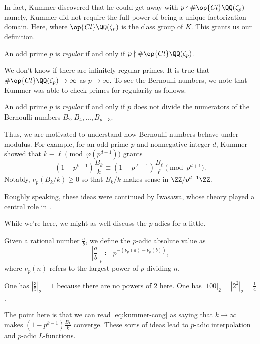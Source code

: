 \documentclass{article}
\begin{document}
In fact, Kummer discovered that he could get away with $p\nmid\#\op{Cl}\QQ(\zeta_p)$---namely, Kummer did not require the full power of being a unique factorization domain. Here, where $\op{Cl}\QQ(\zeta_p)$ is the class group of $K$. This grants us our definition.
\begin{definition}[regular]
	An odd prime $p$ is \textit{regular} if and only if $p\nmid\#\op{Cl}\QQ(\zeta_p)$.
\end{definition}
We don't know if there are infinitely regular primes. It is true that $\#\op{Cl}\QQ(\zeta_p)\to\infty$ as $p\to\infty$. To see the Bernoulli numbers, we note that Kummer was able to check primes for regularity as follows.
\begin{theorem}
	An odd prime $p$ is \textit{regular} if and only if $p$ does not divide the numerators of the Bernoulli numbers $B_2,B_4,\ldots,B_{p-3}$.
\end{theorem}
Thus, we are motivated to understand how Bernoulli numbers behave under modulus. For example, for an odd prime $p$ and nonnegative integer $d$, Kummer showed that $k\equiv\ell\pmod{\varphi(p^{d+1})}$ grants
\begin{equation}
	\left(1-p^{k-1}\right)\frac{B_k}k\equiv\left(1-p^{\ell-1}\right)\frac{B_\ell}\ell\pmod{p^{d+1}}. \label{eq:kummer-cong}
\end{equation}
Notably, $\nu_p(B_k/k)\ge0$ so that $B_k/k$ makes sense in $\ZZ/p^{d+1}\ZZ$.
\begin{remark}
	Roughly speaking, these ideas were continued by Iwasawa, whose theory played a central role in .
\end{remark}
While we're here, we might as well discuss the $p$-adics for a little.
\begin{definition}
	Given a rational number $\frac ab$, we define the $p$-adic absolute value as
	\[\left|\frac ab\right|_p\coloneqq p^{-(\nu_p(a)-\nu_p(b))},\]
	where $\nu_p(n)$ refers to the largest power of $p$ dividing $n$.
\end{definition}
\begin{example}
	One has $\left|\frac35\right|_2=1$ because there are no powers of $2$ here. One has $\left|100\right|_2=\left|2^2\right|_2=\frac14$.
\end{example}
The point here is that we can read \eqref{eq:kummer-cong} as saying that $k\to\infty$ makes $\left(1-p^{k-1}\right)\frac{B_k}k$ converge. These sorts of ideas lead to $p$-adic interpolation and $p$-adic $L$-functions.
\end{document}

